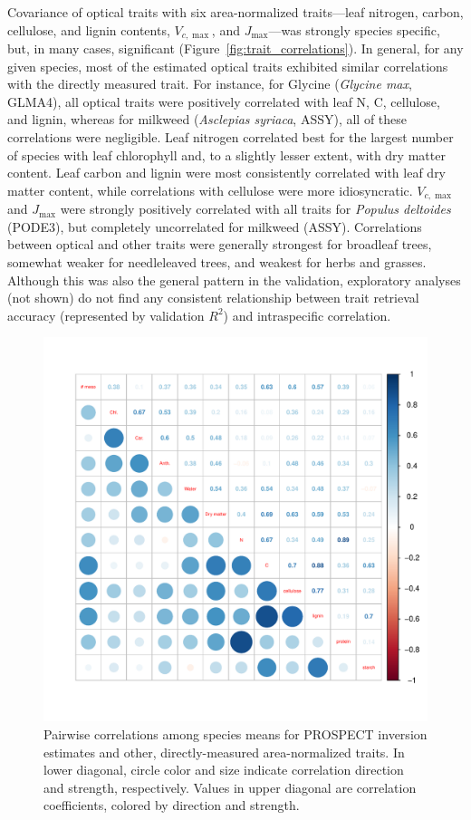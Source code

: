 Covariance of optical traits with six area-normalized traits---leaf nitrogen, carbon, cellulose, and lignin contents, $V_{c,\max}$, and $J_{\max}$---was strongly species specific, but, in many cases, significant (Figure~\ref{fig:trait_correlations}).
In general, for any given species, most of the estimated optical traits exhibited similar correlations with the directly measured trait.
For instance, for Glycine (\textit{Glycine max}, GLMA4), all optical traits were positively correlated with leaf N, C, cellulose, and lignin, whereas for milkweed (\textit{Asclepias syriaca}, ASSY), all of these correlations were negligible.
Leaf nitrogen correlated best for the largest number of species with leaf chlorophyll and, to a slightly lesser extent, with dry matter content.
Leaf carbon and lignin were most consistently correlated with leaf dry matter content, while correlations with cellulose were more idiosyncratic.
$V_{c,\max}$ and $J_{\max}$ were strongly positively correlated with all traits for \textit{Populus deltoides} (PODE3), but completely uncorrelated for milkweed (ASSY).
Correlations between optical and other traits were generally strongest for broadleaf trees, somewhat weaker for needleleaved trees, and weakest for herbs and grasses.
Although this was also the general pattern in the validation, exploratory analyses (not shown) do not find any consistent relationship between trait retrieval accuracy (represented by validation $R^2$) and intraspecific correlation.

\begin{figure}
  \centering
  \includegraphics[width=\textwidth]{figures/trait_correlations_species.pdf}
  \caption{%
    Pairwise correlations among species means for PROSPECT inversion estimates and other, directly-measured area-normalized traits.
    In lower diagonal, circle color and size indicate correlation direction and strength, respectively.
    Values in upper diagonal are correlation coefficients, colored by direction and strength.
  }\label{fig:trait_correlations_species}
\end{figure}

